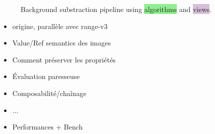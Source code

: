 
\begin{figure}[tbh]
  \begin{minipage}{\linewidth}
    
  \end{minipage}
  \caption{Background substraction pipeline using \colorbox{lightgreen}{algorithms} and
    \colorbox{thistle}{views}.}
  \label{fig.view.comp.sub_bg}
\end{figure}


\clearpage


\begin{itemize}
  \item origine, parallèle avec range-v3
  \item Value/Ref semantics des images
  \item Comment préserver les propriétés
  \item Évaluation paresseuse
  \item Composabilité/chaînage
  \item ...
  \item Performances + Bench
\end{itemize}